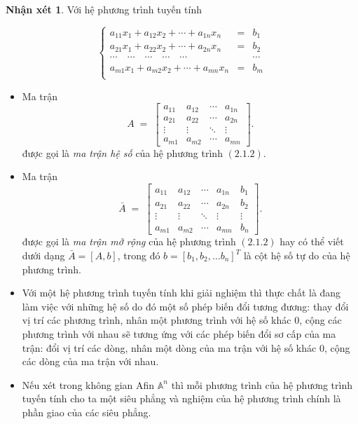 \documentclass[12pt,a4paper,oneside]{book}
\theoremstyle{theorem}
\theoremstyle{definition}
\newtheorem{nx}[theorem2]{Nhận xét}
\begin{document}
\begin{nx}
   
         Với hệ phương trình tuyến tính 
        
        \begin{equation} 
\left\{
\begin{array}{lcl}
a_{11}x_1 + a_{12}x_2 + \cdots + a_{1n}x_n &=& b_1 \\
a_{21}x_1 + a_{22}x_2 + \cdots + a_{2n}x_n &=& b_2 \\
\cdots \quad \cdots \quad \cdots \quad \cdots \quad \cdots && \cdots \\
a_{m1}x_1 + a_{m2}x_2 + \cdots + a_{mn}x_n &=& b_m \\
\end{array}
\right.
\end{equation}
 \begin{itemize}
 \item Ma trận
\[A \;=\;
\begin{bmatrix}
a_{11} & a_{12} & \cdots & a_{1n} \\
a_{21} & a_{22} & \cdots & a_{2n} \\
\vdots & \vdots & \ddots & \vdots \\
a_{m1} & a_{m2} & \cdots & a_{mn}
\end{bmatrix}.
\] được gọi là \textit{ma trận hệ số} của hệ phương trình $(2.1.2)$.

\item Ma trận 
\[\bar{A} \;=\;
\left[\begin{array}{cccc|c}
a_{11} & a_{12} & \cdots & a_{1n} & b_1 \\
a_{21} & a_{22} & \cdots & a_{2n} & b_2\\
\vdots & \vdots & \ddots  & \vdots & \vdots \\
a_{m1} & a_{m2} & \cdots & a_{mn} & b_n
\end{array}\right].
\] được gọi là \textit{ma trận mở rộng} của hệ phương trình $(2.1.2)$ hay có thể viết dưới dạng $\bar{A}=[A,b]$, trong đó $b=[b_1,b_2,...b_n]^T$ là cột hệ số tự do của hệ phương trình.
\item Với một hệ phương trình tuyến tính khi giải nghiệm thì thực chất là đang làm việc với những hệ số do đó một số phép biến đổi tương đương: thay đổi vị trí các phương trình, nhân một phương trình với hệ số khác $0$, cộng các phương trình với nhau sẽ tương ứng với các phép biến đổi sơ cấp của ma trận: đổi vị trí các dòng, nhân một dòng của ma trận với hệ số khác $0$, cộng các dòng của ma trận với nhau. 
\item Nếu xét trong không gian Afin $\mathbb{A}^n$ thì mỗi phương trình của hệ phương trình tuyến tính cho ta một siêu phẳng và nghiệm của hệ phương trình chính là phần giao của các siêu phẳng.


\end{itemize}
\end{nx}
\end{document}
